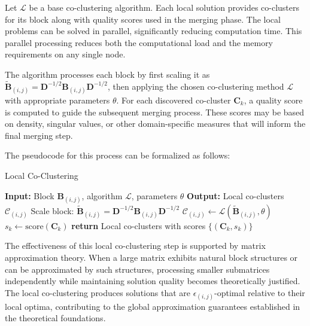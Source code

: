 \documentclass[journal]{IEEEtran}
\begin{document}
Let $\mathcal{L}$ be a base co-clustering algorithm. Each local solution provides co-clusters for its block along with quality scores used in the merging phase. The local problems can be solved in parallel, significantly reducing computation time. This parallel processing reduces both the computational load and the memory requirements on any single node.

The algorithm processes each block by first scaling it as $\tilde{\mathbf{B}}_{(i,j)} = \mathbf{D}^{-1/2}\mathbf{B}_{(i,j)}\mathbf{D}^{-1/2}$, then applying the chosen co-clustering method $\mathcal{L}$ with appropriate parameters $\theta$. For each discovered co-cluster $\mathbf{C}_k$, a quality score is computed to guide the subsequent merging process. These scores may be based on density, singular values, or other domain-specific measures that will inform the final merging step.

The pseudocode for this process can be formalized as follows:

\begin{algorithm}[t]
    \caption{Local Co-Clustering}
    \begin{algorithmic}
        \STATE \textbf{Input:} Block $\mathbf{B}_{(i,j)}$, algorithm $\mathcal{L}$, parameters $\theta$
        \STATE \textbf{Output:} Local co-clusters $\mathcal{C}_{(i,j)}$
        \STATE Scale block: $\tilde{\mathbf{B}}_{(i,j)} = \mathbf{D}^{-1/2}\mathbf{B}_{(i,j)}\mathbf{D}^{-1/2}$
        \STATE $\mathcal{C}_{(i,j)} \leftarrow \mathcal{L}(\tilde{\mathbf{B}}_{(i,j)}, \theta)$
        \STATE $s_k \leftarrow \text{score}(\mathbf{C}_k)$
        \ENDFOR
        \STATE \textbf{return} Local co-clusters with scores $\{(\mathbf{C}_k, s_k)\}$
    \end{algorithmic}
    \label{alg:local-co-clustering}
\end{algorithm}


The effectiveness of this local co-clustering step is supported by matrix approximation theory. When a large matrix exhibits natural block structures or can be approximated by such structures, processing smaller submatrices independently while maintaining solution quality becomes theoretically justified. The local co-clustering produces solutions that are $\epsilon_{(i,j)}$-optimal relative to their local optima, contributing to the global approximation guarantees established in the theoretical foundations.
\end{document}

